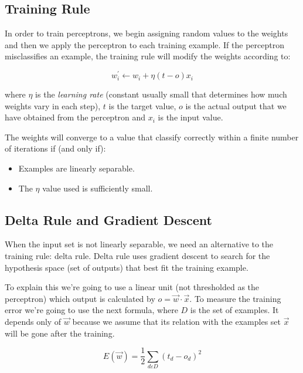 	\subsection{Training Rule}
	In order to train perceptrons, we begin assigning random values to the weights and then we apply the perceptron to each training example. If the perceptron misclassifies an example, the training rule will modify the weights according to:

	\begin{equation}
		\label{training_rule}
		w_{i}^{'} \leftarrow w_{i} + \eta (t - o) x_{i}
	\end{equation}

	where $\eta$ is the \textit{learning rate} (constant usually small that determines how much weights vary in each step), $t$ is the target value, $o$ is the actual output that we have obtained from the perceptron and $x_{i}$ is the input value.

	The weights will converge to a value that classify correctly within a finite number of iterations if (and only if):
	
	\begin{itemize}
		\item Examples are linearly separable.
		\item The $\eta$ value used is sufficiently small.
	\end{itemize}
	
	\subsection{Delta Rule and Gradient Descent}
	When the input set is not linearly separable, we need an alternative to the training rule: delta rule. Delta rule uses gradient descent to search for the hypothesis space (set of outputs) that best fit the training example. 

	To explain this we’re going to use a linear unit (not thresholded as the perceptron) which output is calculated by $o = \vec{w} \cdot \vec{x}$. To measure the training error we’re going to use the next formula, where $D$ is the set of examples. It depends only of $\vec{w}$ because we assume that its relation with the examples set $\vec{x}$ will be gone after the training.

	\begin{equation}
		\label{error_function_full_square}
		E(\vec{w}) = \frac{1}{2} \sum_{d \varepsilon D} (t_d-o_d)^2 
	\end{equation}

